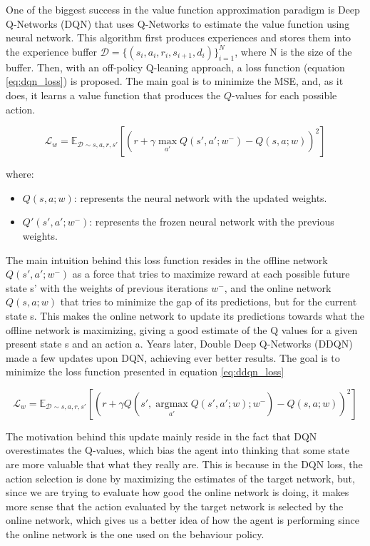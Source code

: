 One of the biggest success in the value function approximation paradigm is Deep Q-Networks (DQN) \cite{mnih2013playing} that uses Q-Networks to estimate the value function using neural network. This algorithm first produces experiences and stores them into the experience buffer $\mathcal{D} = \{(s_i, a_i, r_i, s_{i+1}, d_i)\}_{i=1}^N$, where N is the size of the buffer. Then, with an off-policy Q-leaning approach, a loss function (equation \ref{eq:dqn_loss}) is proposed. The main goal is to minimize the MSE, and, as it does, it learns a value function that produces the ${Q}$-values for each possible action.

\begin{equation} \label{eq:dqn_loss}
	\mathcal{L}_w = \mathbb{E}_{\mathcal{D} \sim s, a, r, s'} \left[ \left( r + \gamma \max_{a'} Q(s', a'; w^-) - Q(s, a; w) \right)^2 \right]
\end{equation}

\noindent where:
\begin{itemize}
	\item $Q(s, a; w)$: represents the neural network with the updated weights.
	\item $Q'(s', a'; w^-)$: represents the frozen neural network with the previous weights.
\end{itemize}

The main intuition behind this loss function resides in the offline network $Q(s', a'; w^-)$ as a force that tries to maximize reward at each possible future state s' with the weights of previous iterations $w^-$, and the online network $Q(s, a; w)$ that tries to minimize the gap of its predictions, but for the current state s. This makes the online network to update its predictions towards what the offline network is maximizing, giving a good estimate of the Q values for a given present state s and an action a. Years later, Double Deep Q-Networks (DDQN) \cite{vanhasselt2015deep} made a few updates upon DQN, achieving ever better results. The goal is to minimize the loss function presented in equation \ref{eq:ddqn_loss} 

\begin{equation} \label{eq:ddqn_loss}
	\mathcal{L}_w =  \mathbb{E}_{\mathcal{D} \sim s, a, r, s'} \left[ \left( r + \gamma Q(s', \operatorname*{argmax}_{a'} Q(s', a'; w); w^-) - Q(s, a; w) \right)^2 \right]
\end{equation}

The motivation behind this update mainly reside in the fact that DQN overestimates the Q-values, which bias the agent into thinking that some state are more valuable that what they really are. This is because in the DQN loss, the action selection is done by maximizing the estimates of the target network, but, since we are trying to evaluate how good the online network is doing, it makes more sense that the action evaluated by the target network is selected by the online network, which gives us a better idea of how the agent is performing since the online network is the one used on the behaviour policy.

